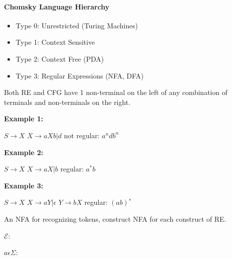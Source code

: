 \documentclass[twocolumn]{article}
\begin{document}
\pagebreak

\paragraph*{Chomsky Language Hierarchy}

\begin{itemize}
  \item Type 0: Unrestricted (Turing Machines)
  \item Type 1: Context Sensitive
  \item Type 2: Context Free (PDA)
  \item Type 3: Regular Expressions (NFA, DFA)
\end{itemize}

Both RE and CFG have 1 non-terminal on the left of any combination of terminals and non-terminals on the right.

\textbf{Example 1:}

$S \to X$
\hfill
$X \to aXb | d$
\hfill
not regular: $a^n d b^n$

\textbf{Example 2:}

$S \to X$
\hfill
$X \to aX | b$
\hfill
regular: $a^* b$

\textbf{Example 3:}

$S \to X$
\hfill
$X \to aY | \epsilon$
\hfill
$Y \to bX$
\hfill
regular: $(ab){^*}$

An NFA for recognizing tokens, construct NFA for each construct of RE\@.

$\mathcal{E}$:


$a \epsilon \Sigma$:


\pagebreak


\end{document}
